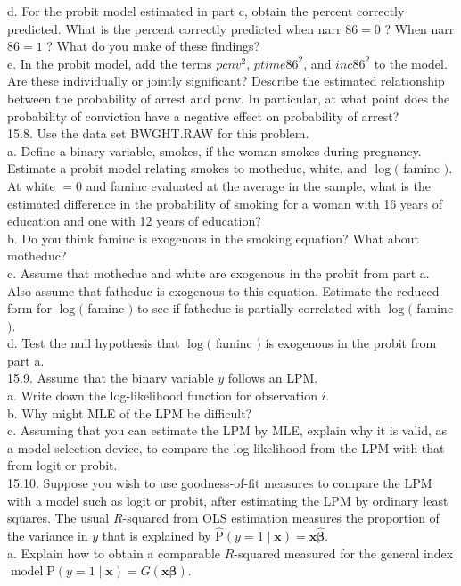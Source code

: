 \documentclass[10pt]{article}
\begin{document}
d. For the probit model estimated in part c, obtain the percent correctly predicted. What is the percent correctly predicted when narr $86=0$ ? When narr $86=1$ ? What do you make of these findings?\\
e. In the probit model, add the terms $p c n v^{2}$, $p t i m e 86^{2}$, and $i n c 86^{2}$ to the model. Are these individually or jointly significant? Describe the estimated relationship between the probability of arrest and pcnv. In particular, at what point does the probability of conviction have a negative effect on probability of arrest?\\
15.8. Use the data set BWGHT.RAW for this problem.\\
a. Define a binary variable, smokes, if the woman smokes during pregnancy. Estimate a probit model relating smokes to motheduc, white, and $\log ($ faminc $)$. At white $=0$ and faminc evaluated at the average in the sample, what is the estimated difference in the probability of smoking for a woman with 16 years of education and one with 12 years of education?\\
b. Do you think faminc is exogenous in the smoking equation? What about motheduc?\\
c. Assume that motheduc and white are exogenous in the probit from part a. Also assume that fatheduc is exogenous to this equation. Estimate the reduced form for $\log ($ faminc $)$ to see if fatheduc is partially correlated with $\log ($ faminc $)$.\\
d. Test the null hypothesis that $\log ($ faminc $)$ is exogenous in the probit from part a.\\
15.9. Assume that the binary variable $y$ follows an LPM.\\
a. Write down the log-likelihood function for observation $i$.\\
b. Why might MLE of the LPM be difficult?\\
c. Assuming that you can estimate the LPM by MLE, explain why it is valid, as a model selection device, to compare the log likelihood from the LPM with that from logit or probit.\\
15.10. Suppose you wish to use goodness-of-fit measures to compare the LPM with a model such as logit or probit, after estimating the LPM by ordinary least squares. The usual $R$-squared from OLS estimation measures the proportion of the variance in $y$ that is explained by $\hat{\mathrm{P}}(y=1 \mid \mathbf{x})=\mathbf{x} \hat{\boldsymbol{\beta}}$.\\
a. Explain how to obtain a comparable $R$-squared measured for the general index $\operatorname{model} \mathrm{P}(y=1 \mid \mathbf{x})=G(\mathbf{x} \boldsymbol{\beta})$.\\
\end{document}
